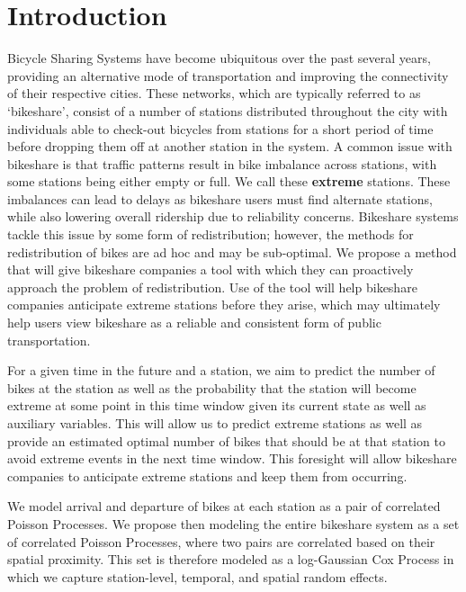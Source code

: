 \documentclass{acm_proc_article-sp}
\begin{document}

\section{Introduction}

Bicycle Sharing Systems have become ubiquitous over the past several years, providing an alternative mode of transportation and improving the connectivity of their respective cities.  These networks, which are typically referred to as `bikeshare', consist of a number of stations distributed throughout the city with individuals able to check-out bicycles from stations for a short period of time before dropping them off at another station in the system.  A common issue with bikeshare is that traffic patterns result in bike imbalance across stations, with some stations being either empty or full.  We call these {\bf extreme} stations. These imbalances can lead to delays as bikeshare users must find alternate stations, while also lowering overall ridership due to reliability concerns. Bikeshare systems tackle this issue by some form of redistribution; however, the methods for redistribution of bikes are ad hoc and may be sub-optimal. We propose a method that will give bikeshare companies a tool with which they can proactively approach the problem of redistribution. Use of the tool will help bikeshare companies anticipate extreme stations before they arise, which may ultimately help users view bikeshare as a reliable and consistent form of public transportation.

For a given time in the future and a station, we aim to predict the number of bikes at the station as well as the probability that the station will become extreme at some point in this time window given its current state as well as auxiliary variables.  This will allow us to predict extreme stations as well as provide an estimated optimal number of bikes that should be at that station to avoid extreme events in the next time window. This foresight will allow bikeshare companies to anticipate extreme stations and keep them from occurring.

We model arrival and departure of bikes at each station as a pair of correlated Poisson Processes.  We propose then modeling the entire bikeshare system as a set of correlated Poisson Processes, where two pairs are correlated based on their spatial proximity.  This set is therefore modeled as a log-Gaussian Cox Process in which we capture station-level, temporal, and spatial random effects.  
\end{document}
